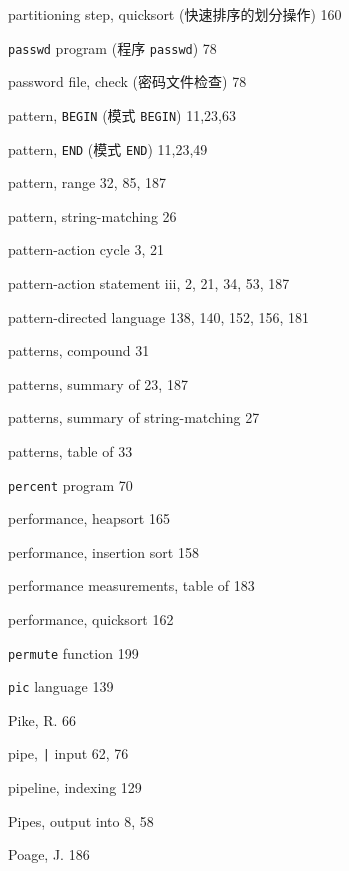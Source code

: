 \begin{multicols}{3}
\hangindent=3pc  partitioning step, quicksort
(快速排序的划分操作) 160

\hangindent=3pc  \verb'passwd' program (程序 \verb'passwd') 78

\hangindent=3pc  password file, check (密码文件检查) 78

\hangindent=3pc  pattern, \verb'BEGIN' (模式 \verb'BEGIN') 11,23,63

\hangindent=3pc  pattern, \verb'END' (模式 \verb'END') 11,23,49

\hangindent=3pc  pattern, range 32, 85, 187

\hangindent=3pc  pattern, string-matching 26

\hangindent=3pc  pattern-action cycle 3, 21

\hangindent=3pc  pattern-action statement iii, 2, 21, 34, 53, 187

\hangindent=3pc  pattern-directed language 138,  140, 152, 156, 181

\hangindent=3pc  patterns, compound 31

\hangindent=3pc  patterns, summary of 23, 187

\hangindent=3pc  patterns, summary of string-matching 27

\hangindent=3pc  patterns, table of 33

\hangindent=3pc  \verb'percent' program 70

\hangindent=3pc  performance, heapsort 165

\hangindent=3pc  performance, insertion sort 158

\hangindent=3pc  performance measurements, table of 183

\hangindent=3pc  performance, quicksort 162

\hangindent=3pc  \verb'permute' function 199

\hangindent=3pc  \verb'pic' language 139

\hangindent=3pc  Pike, R. 66

\hangindent=3pc  pipe, \verb'|' input 62, 76

\hangindent=3pc  pipeline, indexing 129

\hangindent=3pc  Pipes, output into 8, 58

\hangindent=3pc  Poage, J. 186


\end{multicols}
